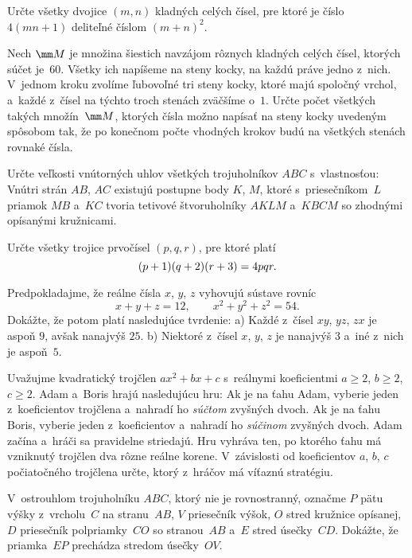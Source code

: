 {%
Určte všetky dvojice $(m,n)$ kladných celých čísel, pre ktoré je číslo $4(mn+1)$ deliteľné číslom $(m+n)^2$.}

{%
Nech $\mm M$ je množina šiestich navzájom rôznych kladných celých čísel, ktorých súčet je~$60$. Všetky ich napíšeme na steny kocky, na každú práve jedno z~nich. V~jednom kroku zvolíme ľubovoľné tri steny kocky, ktoré majú spoločný vrchol, a~každé z~čísel
na týchto troch stenách zväčšíme o~$1$. Určte počet všetkých takých množín~$\mm M$, ktorých čísla možno napísať na steny kocky uvedeným spôsobom tak, že po konečnom počte vhodných krokov budú na všetkých stenách rovnaké čísla.}

{%
Určte veľkosti vnútorných uhlov všetkých trojuholníkov $ABC$ s~vlastnosťou:
Vnútri strán $AB$, $AC$ existujú postupne body $K$, $M$, ktoré s~priesečníkom~$L$
priamok $MB$ a~$KC$ tvoria tetivové štvoruholníky $AKLM$ a~$KBCM$ so
zhodnými opísanými kružnicami.}

{%
Určte všetky trojice prvočísel $(p,q,r)$, pre ktoré platí
$$
\postdisplaypenalty=10000
(p+1)(q+2)(r+3)=4pqr.
$$
}

{%
Predpokladajme, že reálne čísla $x$, $y$, $z$ vyhovujú sústave rovníc
$$
x+y+z=12, \qquad x^2+y^2+z^2=54.
$$
Dokážte, že potom platí nasledujúce tvrdenie:
\ite a) Každé z~čísel $xy$, $yz$, $zx$ je aspoň $9$, avšak nanajvýš $25$.
\ite b) Niektoré z~čísel $x$, $y$, $z$ je nanajvýš $3$ a~iné z~nich je aspoň~$5$.
}

{%
Uvažujme kvadratický trojčlen $ax^2+bx+c$ s~reálnymi koeficientmi $a\ge2$, ${b\ge 2}$, $c\ge 2$.
Adam a~Boris hrajú nasledujúcu hru: Ak je na ťahu Adam, vyberie jeden z~koeficientov trojčlena a~nahradí ho
{\it súčtom\/} zvyšných dvoch. Ak je na ťahu Boris, vyberie jeden
z~koeficientov a~nahradí ho {\it súčinom\/} zvyšných dvoch. Adam začína a~hráči
sa pravidelne striedajú. Hru vyhráva ten, po ktorého ťahu má vzniknutý trojčlen
dva rôzne reálne korene. V~závislosti od koeficientov $a$, $b$, $c$ počiatočného trojčlena
určte, ktorý z~hráčov má víťaznú stratégiu.
}

{%
V~ostrouhlom trojuholníku $ABC$, ktorý nie je rovnostranný, označme $P$ pätu výšky z~vrcholu~$C$ na
stranu~$AB$, $V$ priesečník výšok, $O$ stred kružnice
opísanej, $D$ priesečník polpriamky~$CO$ so stranou~$AB$ a~$E$ stred úsečky~$CD$.
Dokážte, že priamka~$EP$ prechádza stredom úsečky~$OV$.}

